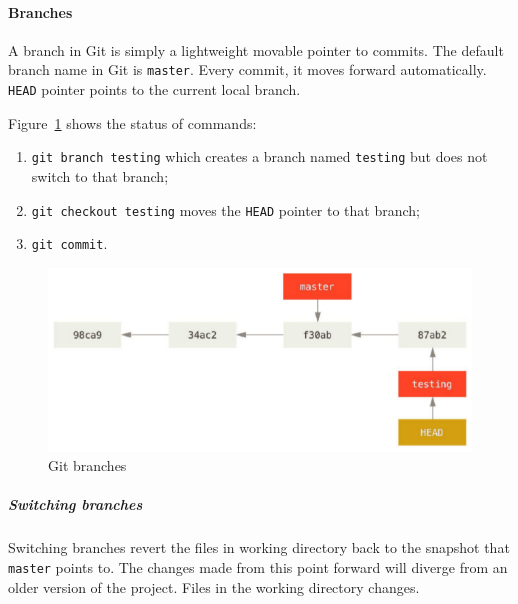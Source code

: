 \paragraph{Branches}
A branch in Git is simply a lightweight movable pointer to commits. The default branch name in Git is \texttt{master}. Every commit, it moves forward automatically. \texttt{HEAD} pointer points to the current local branch.

Figure~\ref{img:git_branches} shows the status of commands:
\begin{enumerate}
\item \texttt{git branch testing} which creates a branch named \texttt{testing} but does not switch to that branch;
\item \texttt{git checkout testing} moves the \texttt{HEAD} pointer to that branch;
\item \texttt{git commit}.
\end{enumerate}

\begin{figure}[hbtp]
\centering
\includegraphics[scale=0.4]{images/git_branches.png}
\caption{Git branches}
\label{img:git_branches}
\end{figure}

\subparagraph{Switching branches}
Switching branches revert the files in working directory back to the snapshot that \texttt{master} points to. The changes made from this point forward will diverge from an older version of the project. Files in the working directory changes.

